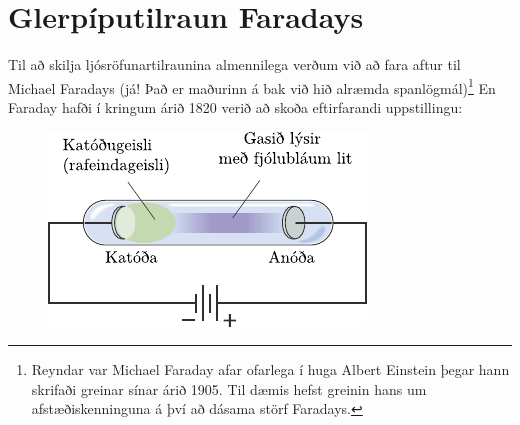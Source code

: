 \section{Glerpíputilraun Faradays}

Til að skilja ljósröfunartilraunina almennilega verðum við að fara aftur til Michael Faradays (já! Það er maðurinn á bak við hið alræmda spanlögmál)\footnote{Reyndar var Michael Faraday afar ofarlega í huga Albert Einstein þegar hann skrifaði greinar sínar árið 1905. Til dæmis hefst greinin hans um afstæðiskenninguna á því að dásama störf Faradays.} En Faraday hafði í kringum árið 1820 verið að skoða eftirfarandi uppstillingu:

\begin{figure}[H]
    \centering
    \includegraphics{figures/faraday.pdf}
\end{figure}

